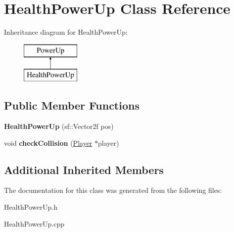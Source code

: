 \hypertarget{class_health_power_up}{}\section{Health\+Power\+Up Class Reference}
\label{class_health_power_up}
Inheritance diagram for Health\+Power\+Up\+:\begin{figure}[H]
\begin{center}
\leavevmode
\includegraphics[height=2.000000cm]{class_health_power_up}
\end{center}
\end{figure}
\subsection*{Public Member Functions}
\begin{DoxyCompactItemize}
\item 
\mbox{\label{class_health_power_up_a4324428f812fbf45c59b0bbaa94bdd7b}} 
{\bfseries Health\+Power\+Up} (sf\+::\+Vector2f pos)
\item 
\mbox{\label{class_health_power_up_a71721090118d9f61b57233b85ae65eca}} 
void {\bfseries check\+Collision} (\mbox{\hyperlink{class_player}{Player}} $\ast$player)
\end{DoxyCompactItemize}
\subsection*{Additional Inherited Members}


The documentation for this class was generated from the following files\+:\begin{DoxyCompactItemize}
\item 
Health\+Power\+Up.\+h\item 
Health\+Power\+Up.\+cpp\end{DoxyCompactItemize}
